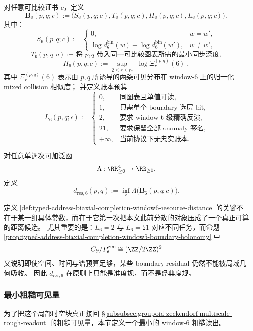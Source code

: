\begin{definition}\label{def:typed-address-biaxial-completion-window6-resource-vector}
对任意可比较证书 \(c\)，定义
\[
\mathbf B_6(p,q;c):=\bigl(S_6(p,q;c),T_6(p,q;c),\Pi_6(p,q;c),L_6(p,q;c)\bigr),
\]
其中：
\[
S_6(p,q;c):=
\begin{cases}
0,& w=w',\\[4pt]
\log d_6^{\mathrm{bin}}(w)+\log d_6^{\mathrm{bin}}(w'),& w\neq w',
\end{cases}
\]
\[
T_6(p,q;c):=\text{将 }p,q\text{ 带入同一可比较图表所需的最小同步深度},
\]
\[
\Pi_6(p,q;c):=
\sup_{2\le r\le r_\ast}
\bigl|
\log \Xi_r^{(p,q)}(6)
\bigr|,
\]
其中 \(\Xi_r^{(p,q)}(6)\) 表示由 \(p,q\) 所诱导的两条可见分布在 window-\(6\) 上的归一化 mixed collision 相似度；
并定义账本预算
\[
L_6(p,q;c):=
\begin{cases}
0,& \text{同图表且单值可读},\\
1,& \text{只需单个 boundary 选层 bit},\\
2,& \text{要求 window-6 级精确反演},\\
21,& \text{要求保留全部 anomaly 签名},\\
+\infty,& \text{当前协议下无忠实账本}.
\end{cases}
\]
\end{definition}

\begin{definition}\label{def:typed-address-biaxial-completion-window6-resource-distance}
对任意单调次可加泛函
\[
\Lambda:\RR_{\ge 0}^4\to \RR_{\ge 0},
\]
定义
\[
d_{\mathrm{res},6}(p,q):=\inf_c \Lambda\bigl(\mathbf B_6(p,q;c)\bigr).
\]
\end{definition}

定义 \ref{def:typed-address-biaxial-completion-window6-resource-distance} 的关键不在于某一组具体常数，而在于它第一次把本文此前分散的对象压成了一个真正可算的距离候选。
尤其重要的是：\(L_6=2\) 与 \(L_6=21\) 对应不同任务，而命题 \ref{prop:typed-address-biaxial-completion-window6-boundary-holonomy} 中
\[
C_{\partial}/P_6^{\mathrm{geo}}\cong(\ZZ/2\ZZ)^2
\]
又说明即使空间、时间与谱预算足够，某些 boundary residual 仍然不能被局域几何吸收。
因此 \(d_{\mathrm{res},6}\) 在原则上只能是准度规，而不是经典度规。

\subsubsection{最小粗糙可见量}\label{subsubsec:typed-address-biaxial-completion-window6-rough-visible-observable}
为了把这个局部时空块真正接回 \S\ref{subsubsec:groupoid-zeckendorf-multiscale-rough-readout} 的粗糙可见量，本节定义一个最小的 window-\(6\) 粗糙读出。

